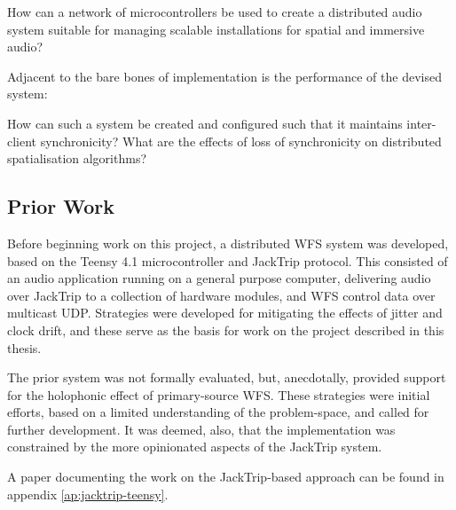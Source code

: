 \begin{researchq}
    \label{rq:rq1}
    How can a network of microcontrollers be used to create a distributed
    audio system suitable for managing scalable installations for spatial
    and immersive audio?
\end{researchq}

\noindent
Adjacent to the bare bones of implementation is the performance of the devised
system:

\begin{researchq}
    \label{rq:rq2}
    How can such a system be created and configured such that it maintains
    inter-client synchronicity? What are the effects of loss of
    synchronicity on distributed spatialisation algorithms?
\end{researchq}


\subsection{Prior Work}

Before beginning work on this project, a distributed WFS system was
developed, based on the Teensy 4.1 microcontroller and JackTrip protocol.
This consisted of an audio application running on a general purpose computer,
delivering audio over JackTrip to a collection of hardware modules, and
WFS control data over multicast UDP.
Strategies were developed for mitigating the effects of jitter and clock drift,
and these serve as the basis for work on the project described in this thesis.

The prior system was not formally evaluated, but, anecdotally, provided
support for the holophonic effect of primary-source WFS.
These strategies were initial efforts, based on a limited understanding
of the problem-space, and called for further development.
It was deemed, also, that the implementation was constrained by the more
opinionated aspects of the JackTrip system.

A paper documenting the work on the JackTrip-based approach can be found in
appendix \ref{ap:jacktrip-teensy}.

